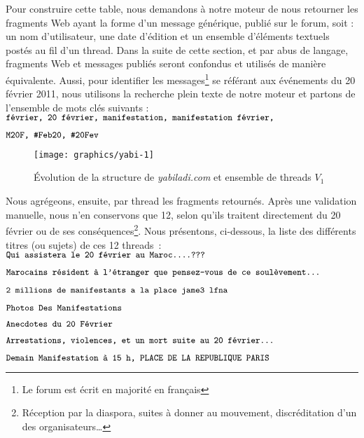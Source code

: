 \documentclass[symmetric,justified,marginals=raggedouter]{tufte-book}
\begin{document}
\noindent Pour construire cette table, nous demandons à notre moteur de nous retourner les fragments Web ayant la forme d'un message générique, publié sur le forum, soit : un nom d'utilisateur, une date d'édition et un ensemble d'éléments textuels postés au fil d'un thread. Dans la suite de cette section, et par abus de langage, fragments Web et messages publiés seront confondus et utilisés de manière équivalente. Aussi, pour identifier les messages\footnote{\RaggedOuter Le forum est écrit en majorité en français} se référant aux événements du 20 février 2011, nous utilisons la recherche plein texte de notre moteur et partons de l'ensemble de mots clés suivants :\\

\noindent $\small \texttt{février, 20 février, manifestation, manifestation février,}$

\noindent $\small \texttt{M20F, \#Feb20, \#20Fev}$\\

\begin{figure*}[hbtp]%
  \texttt{[image: graphics/yabi-1]}
  \caption{Évolution de la structure de \textit{yabiladi.com} et ensemble de threads $V_1$}
  \label{fig:yabi-1}
\end{figure*}

\noindent Nous agrégeons, ensuite, par thread les fragments retournés. Après une validation manuelle, nous n'en conservons que 12, selon qu'ils traitent directement du 20 février ou de ses conséquences\footnote{\RaggedOuter Réception par la diaspora, suites à donner au mouvement, discréditation d'un des organisateurs\ldots{}}. Nous présentons, ci-dessous, la liste des différents titres (ou sujets) de ces 12 threads~:\\

\noindent $\small \texttt{Qui assistera le 20 février au Maroc....???}$

\noindent $\small \texttt{Marocains résident à l'étranger que pensez-vous de ce soulèvement...}$

\noindent $\small \texttt{2 millions de manifestants a la place jame3 lfna}$

\noindent $\small \texttt{Photos Des Manifestations}$

\noindent $\small \texttt{Anecdotes du 20 Février}$

\noindent $\small \texttt{Arrestations, violences, et un mort suite au 20 février...}$

\noindent $\small \texttt{Demain Manifestation à 15 h, PLACE DE LA REPUBLIQUE PARIS}$ 
\end{document}

